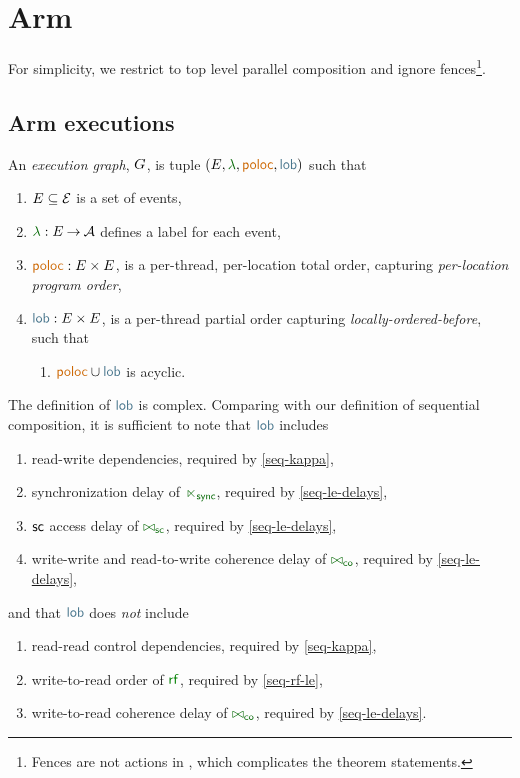 \section{Arm}
\label{sec:arm}
For simplicity, we restrict to top level parallel composition and ignore
fences\footnote{Fences are not actions in \armeight{}, which complicates the
  theorem statements.}.

\subsection{Arm executions}
\begin{definition}
  An \emph{\armeight{} execution graph}, $G$, is tuple
  $(\aEvs, \labeling, {\rpoloc}, {\rlob})$ such that
  \begin{enumerate}[,label=(\textsc{a}\arabic*),ref=\textsc{a}\arabic*]
  \item $E\subseteq\mathcal{E}$ is a set of {events},
  \item $\labeling: \aEvs \fun \Act$ defines a {label} for each event,
  \item ${\rpoloc} : \aEvs\times\aEvs$, is a per-thread, per-location total
    order, capturing \emph{per-location program order},
  \item ${\rlob} : \aEvs\times\aEvs$, is a per-thread partial order capturing
    \emph{locally-ordered-before}, such that
    \begin{enumerate}
    \item \label{arm-lob-poloc}
      ${\rpoloc} \cup {\rlob}$ is acyclic.
    \end{enumerate}
  \end{enumerate}
\end{definition}

The definition of $\rlob$ is complex.  Comparing with our definition of
sequential composition, it is sufficient to note that $\rlob$ includes
\begin{enumerate}[label=(\textsc{l}\arabic*),ref=\textsc{l}\arabic*]
\item read-write dependencies, required by \ref{seq-kappa},
\item synchronization delay of ${\reorderra}$, required by \ref{seq-le-delays},
\item ${\mathsf{sc}}$ access delay of ${\eqreordersc}$, required by \ref{seq-le-delays},
\item write-write and read-to-write coherence delay of ${\eqreorderco}$, required by \ref{seq-le-delays},
\end{enumerate}
and that $\rlob$ does \emph{not} include
\begin{enumerate}[resume,label=(\textsc{l}\arabic*),ref=\textsc{l}\arabic*]
\item \label{lob-rr} 
  read-read control dependencies, required by \ref{seq-kappa},
\item \label{lob-rf}
  write-to-read order of $\rrfx$, required by \ref{seq-rf-le},
\item \label{lob-wr}
  write-to-read coherence delay of ${\eqreorderco}$, required by \ref{seq-le-delays}.
\end{enumerate}

